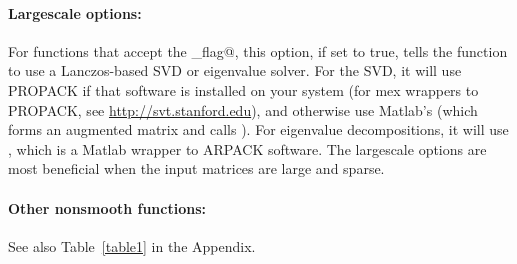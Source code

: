 \documentclass{article}
\newcommand{\<}{\langle}
\renewcommand{\>}{\rangle}
\begin{document}
\paragraph{Largescale options:}\label{sec:largescale}
For functions that accept the \verb@largescale_flag@, this option, if set to true, tells the function to use a Lanczos-based SVD or eigenvalue solver. For the SVD, it will use PROPACK if that software is installed on your system (for mex wrappers to PROPACK, see \url{http://svt.stanford.edu}), and otherwise use Matlab's \verb@svds@ (which forms an augmented matrix and calls \verb@eigs@). For eigenvalue decompositions, it will use \verb@eigs@, which is a Matlab wrapper to ARPACK software. The largescale options are most beneficial when the input matrices are large and sparse.

\paragraph{Other nonsmooth functions:} \label{sec:prox2}
See also Table~\ref{table1} in the Appendix. %
\end{document}
